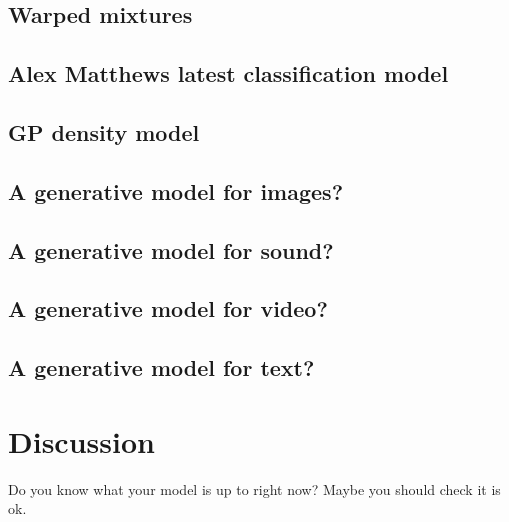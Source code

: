 \documentclass{article}
\begin{document}
\subsection{Warped mixtures}

\subsection{Alex Matthews latest classification model}

\subsection{GP density model}

\subsection{A generative model for images?}

\subsection{A generative model for sound?}

\subsection{A generative model for video?}

\subsection{A generative model for text?}

\section{Discussion}

Do you know what your model is up to right now?
Maybe you should check it is ok.



\end{document}

